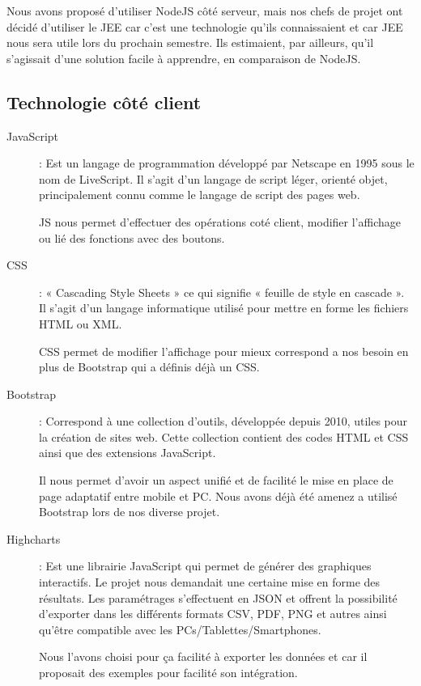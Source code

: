 Nous avons proposé d'utiliser NodeJS côté serveur, mais nos chefs de projet ont décidé d'utiliser le JEE car c'est une technologie qu'ils connaissaient et car JEE nous sera utile lors du prochain semestre. Ils estimaient, par ailleurs, qu'il s'agissait d'une solution facile à apprendre, en comparaison de NodeJS. 

\subsection{Technologie côté client}

\begin{description}

\item[JavaScript] : Est un langage de programmation développé par Netscape en 1995 sous le nom de LiveScript. Il s'agit d'un langage de script léger, orienté objet, principalement connu comme le langage de script des pages web. \

JS nous permet d'effectuer des opérations coté client, modifier l'affichage ou lié des fonctions avec des boutons.

\item[CSS] : « Cascading Style Sheets » ce qui signifie « feuille de style en cascade ». 
Il s'agit d'un langage informatique utilisé pour mettre en forme les fichiers HTML ou XML. \

CSS permet de modifier l'affichage pour mieux correspond a nos besoin en plus de Bootstrap qui a définis déjà un CSS.

\item[Bootstrap] : Correspond à une collection d'outils, développée depuis 2010, utiles pour la création de sites web. Cette collection contient des codes HTML et CSS ainsi que des extensions JavaScript. \

Il nous permet d'avoir un aspect unifié et de facilité le mise en place de page
adaptatif entre mobile et PC. Nous avons déjà été amenez a utilisé Bootstrap lors de nos diverse projet. 

\item[Highcharts] : Est une librairie JavaScript qui permet de générer des graphiques interactifs. Le projet nous demandait une certaine mise en forme des résultats. Les paramétrages s'effectuent en JSON et offrent la possibilité d'exporter dans les différents formats CSV, PDF, PNG et autres ainsi qu'être compatible avec les PCs/Tablettes/Smartphones.

Nous l'avons choisi pour ça facilité à exporter les données et car il proposait
des exemples pour facilité son intégration.

\end{description}

